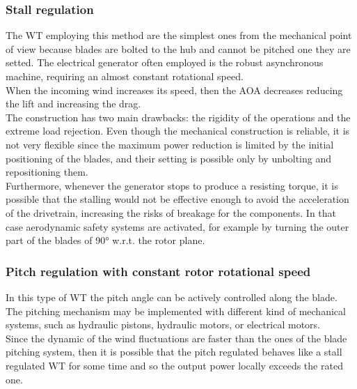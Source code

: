 \subsubsection{Stall regulation}
The \acrshort{WT} employing this method are the simplest ones from the mechanical point of view because blades are bolted to the hub and cannot be pitched one they are setted. The electrical generator often employed is the robust asynchronous machine, requiring an almost constant rotational speed.\\
When the incoming wind increases its speed, then the \acrshort{AOA} decreases reducing the lift and increasing the drag.\\
The construction has two main drawbacks: the rigidity of the operations and the extreme load rejection. Even though the mechanical construction is reliable, it is not very flexible since the maximum power reduction is limited by the initial positioning of the blades, and their setting is possible only by unbolting and repositioning them.\\
Furthermore, whenever the generator stops to produce a resisting torque, it is possible that the stalling would not be effective enough to avoid the acceleration of the drivetrain, increasing the risks of breakage for the components. In that case aerodynamic safety systems are activated, for example by turning the outer part of the blades of 90$\si{\degree}$ w.r.t. the rotor plane. 

\subsubsection{Pitch regulation with constant rotor rotational speed}
In this type of \acrshort{WT} the pitch angle can be actively controlled along the blade. The pitching mechanism may be implemented with different kind of mechanical systems, such as hydraulic pistons, hydraulic motors, or electrical motors. \\
Since the dynamic of the wind fluctuations are faster than the ones of the blade pitching system, then it is possible that the pitch regulated behaves like a stall regulated \acrshort{WT} for some time and so the output power locally exceeds the rated one.

